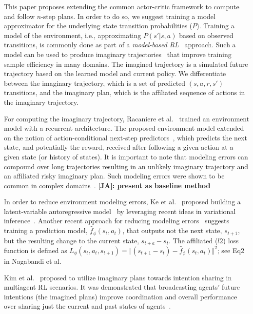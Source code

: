 \documentclass{article}
\newcommand{\JA}[1] {{\color{red} \textbf{[JA]: #1}}}
\begin{document}
        This paper proposes extending the common actor-critic framework to compute and follow $n$-step plans. In order to do so, we suggest training a model approximator for the underlying state transition probabilities ($P$).   
        Training a model of the environment, i.e., approximating $P(s'|s,a)$ based on observed transitions, is commonly done as part of a \textit{model-based RL}~\cite{kaiser2019model,xu2020prediction} approach. Such a model can be used to produce imaginary trajectories~\cite{racaniere2017imagination} that improve training sample efficiency in many domains. The imagined trajectory is a simulated future trajectory based on the learned model and current policy. We differentiate between the imaginary trajectory, which is a set of predicted $(s,a,r,s')$ transitions, and the imaginary plan, which is the affiliated sequence of actions in the imaginary trajectory. 

        For computing the imaginary trajectory, Racaniere et al.~\citeyear{racaniere2017imagination} trained an environment model with a recurrent architecture. The proposed environment model extended on the notion of action-conditional next-step predictors~\cite{oh2015action,chiappa2017recurrent,leibfried2017deep}, which predicts the next state, and potentially the reward, received after following a given action at a given state (or history of states).
        It is important to note that modeling errors can compound over long trajectories resulting in an unlikely imaginary trajectory and an affiliated risky imaginary plan. Such modeling errors were shown to be common in complex domains~\cite{talvitie2014model,talvitie2015agnostic}. \JA{present as baseline method}

        In order to reduce environment modeling errors, Ke et al.~\citeyear{ke2018modeling} proposed building a latent-variable autoregressive model~\cite{gulrajani2016pixelvae} by leveraging recent ideas in variational inference~\cite{zhang2018advances}. Another recent approach for reducing modeling errors~\cite{nagabandi2018neural} suggests training a prediction model, $\hat{f}_\phi(s_t, a_t)$, that outputs not the next state, $s_{t+1}$, but the resulting change to the current state, $s_{t+a}-s_t$. The affiliated ($l2$) loss function is defined as $L_\phi(s_t,a_t,s_{t+1})=\Vert (s_{t+1}-s_t) -  \hat{f}_\phi(s_t, a_t) \Vert ^2$; see Eq2 in Nagabandi et al.

        Kim et al.~\citeyear{kim2020communication} proposed to utilize imaginary plans towards intention sharing in multiagent RL scenarios. It was demonstrated that broadcasting agents' future intentions (the imagined plans) improve coordination and overall performance over sharing just the current and past states of agents~\cite{foerster2016learning,sukhbaatar2016learning,jiang2018learning,das2019tarmac}.  
\end{document}

